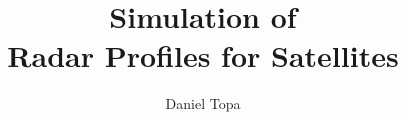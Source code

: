 \documentclass[10pt, oneside]{article}
\title{Simulation of \\Radar Profiles for Satellites}
\author{Daniel Topa\\\TopaHIIEmail}
\affil{\missiontech}
\begin{document}
\maketitle
\tableofcontents

		
		
		
		
		
		
		
		\appendix
		
		
		
		

\appendix

% 

\nocite{*}
\printbibliography
\end{document}
